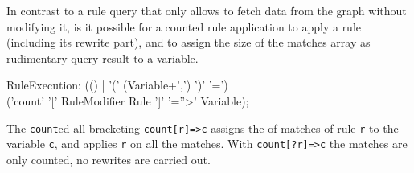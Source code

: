 In contrast to a rule query that only allows to fetch data from the graph without modifying it, is it possible for a counted rule application to apply a rule (including its rewrite part), and to assign the size of the matches array as rudimentary query result to a variable.

\begin{rail}
  RuleExecution: (() 
	| '(' (Variable+',') ')' '=') \\ ('count' '[' RuleModifier Rule ']' '=''>' Variable);
\end{rail}

The \texttt{count}ed all bracketing \texttt{count[r]=>c} assigns the  of matches of rule \texttt{r} to the variable \texttt{c}, and applies \texttt{r} on all the matches.
With \texttt{count[?r]=>c} the matches are only counted, no rewrites are carried out.

